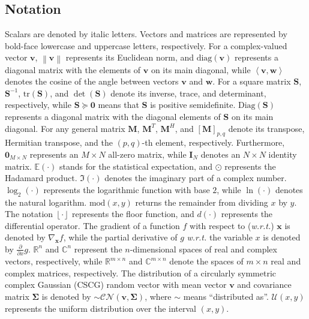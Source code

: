 \documentclass[lettersize,journal]{IEEEtran}
\begin{document}
\subsection{Notation}
Scalars are denoted by italic letters. Vectors and matrices are represented by bold-face lowercase and uppercase letters, respectively. For a complex-valued vector $\mathbf{v}$, $\left \| \mathbf{v} \right \|$ represents its Euclidean norm, and $\textrm{diag}\left ( \mathbf{v} \right )$ represents a diagonal matrix with the elements of $\mathbf{v}$ on its main diagonal, while $\left \langle \mathbf{v}, \mathbf{w} \right \rangle$ denotes the cosine of the angle between vectors $\mathbf{v}$ and $\mathbf{w}$. For a square matrix $\mathbf{S}$, $\mathbf{S}^{-1}$, $\textrm{tr} \left (\mathbf{S} \right )$, and $\det \left (\mathbf{S} \right )$ denote its inverse, trace, and determinant, respectively, while $\mathbf{S}\succeq \mathbf{0}$ means that $\mathbf{S}$ is positive semidefinite. $\textrm{Diag}\left ( \mathbf{S} \right )$ represents a diagonal matrix with the diagonal elements of $\mathbf{S}$ on its main diagonal. For any general matrix $\mathbf{M}$, $\mathbf{M}^{T}$, $\mathbf{M}^{H}$, and $\left [ \mathbf{M} \right ]_{p,q}$ denote its transpose, Hermitian transpose, and the $\left ( p,q \right )$-th element, respectively. Furthermore, $\mathbf{0}_{M \times N}$ represents an $M \times N$ all-zero matrix, while $\mathbf{I}_N$ denotes an $N \times N$ identity matrix. $\mathbb{E}\left ( \cdot \right )$ stands for the statistical expectation, and $\odot $ represents the Hadamard product. $\Im \left ( \cdot \right )$ denotes the imaginary part of a complex number. $\log_{2}\left ( \cdot \right )$ represents the logarithmic function with base $2$, while $\ln\left ( \cdot \right )$ denotes the natural logarithm. $\textrm{mod}\left ( x,y \right )$ returns the remainder from dividing $x$ by $y$. The notation $\left \lfloor \cdot \right \rfloor$ represents the floor function, and $d\left ( \cdot \right )$ represents the differential operator. The gradient of a function $f$ with respect to (\emph{w.r.t.}) $\mathbf{x}$ is denoted by $\nabla_\mathbf{x} f$, while the partial derivative of $g$ \emph{w.r.t.} the variable $x$ is denoted by $\frac{\partial}{\partial x}g$. $\mathbb{R}^{n}$ and $\mathbb{C}^{n}$ represent the $n$-dimensional spaces of real and complex vectors, respectively, while $\mathbb{R}^{m\times n}$ and $\mathbb{C}^{m\times n}$ denote the spaces of $m\times n$ real and complex matrices, respectively. The distribution of a circularly symmetric complex Gaussian (CSCG) random vector with mean vector $\mathbf{v}$ and covariance matrix $\boldsymbol{\Sigma}$ is denoted by $\sim \mathcal{CN}\left ( \mathbf{v},\boldsymbol{\Sigma} \right )$, where $\sim $ means ``distributed as''. $\mathcal{U}\left ( x,y \right )$ represents the uniform distribution over the interval $\left ( x,y \right )$.
\end{document}
